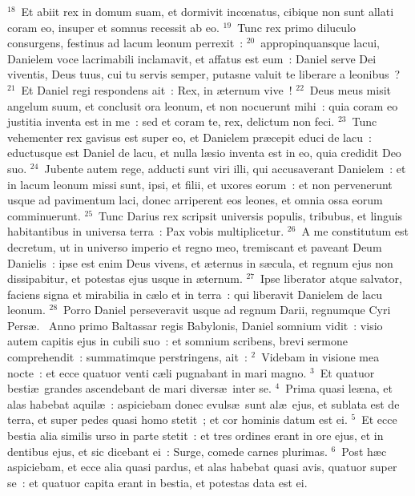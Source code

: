 ${}^{18}$~Et abiit rex in domum suam, et dormivit incœnatus, cibique non sunt allati coram eo, insuper et somnus recessit ab eo.
${}^{19}$~Tunc rex primo diluculo consurgens, festinus ad lacum leonum perrexit~:
${}^{20}$~appropinquansque lacui, Danielem voce lacrimabili inclamavit, et affatus est eum~: Daniel serve Dei viventis, Deus tuus, cui tu servis semper, putasne valuit te liberare a leonibus~?
${}^{21}$~Et Daniel regi respondens ait~: Rex, in \ae ternum vive~!
${}^{22}$~Deus meus misit angelum suum, et conclusit ora leonum, et non nocuerunt mihi~: quia coram eo justitia inventa est in me~: sed et coram te, rex, delictum non feci.
${}^{23}$~Tunc vehementer rex gavisus est super eo, et Danielem pr\ae cepit educi de lacu~: eductusque est Daniel de lacu, et nulla l\ae sio inventa est in eo, quia credidit Deo suo.
${}^{24}$~Jubente autem rege, adducti sunt viri illi, qui accusaverant Danielem~: et in lacum leonum missi sunt, ipsi, et filii, et uxores eorum~: et non pervenerunt usque ad pavimentum laci, donec arriperent eos leones, et omnia ossa eorum comminuerunt.
${}^{25}$~Tunc Darius rex scripsit universis populis, tribubus, et linguis habitantibus in universa terra~: Pax vobis multiplicetur.
${}^{26}$~A me constitutum est decretum, ut in universo imperio et regno meo, tremiscant et paveant Deum Danielis~: ipse est enim Deus vivens, et \ae ternus in s\ae cula, et regnum ejus non dissipabitur, et potestas ejus usque in \ae ternum.
${}^{27}$~Ipse liberator atque salvator, faciens signa et mirabilia in c\ae lo et in terra~: qui liberavit Danielem de lacu leonum.
${}^{28}$~Porro Daniel perseveravit usque ad regnum Darii, regnumque Cyri Pers\ae .
~\lettrine[lines=10,image=true,loversize=0.05,lraise=-0.03]{A}{}nno primo Baltassar regis Babylonis, Daniel somnium vidit~: visio autem capitis ejus in cubili suo~: et somnium scribens, brevi sermone comprehendit~: summatimque perstringens, ait~:
${}^{2}$~Videbam in visione mea nocte~: et ecce quatuor venti c\ae li pugnabant in mari magno.
${}^{3}$~Et quatuor besti\ae\ grandes ascendebant de mari divers\ae\ inter se.
${}^{4}$~Prima quasi le\ae na, et alas habebat aquil\ae~: aspiciebam donec evuls\ae\ sunt al\ae\ ejus, et sublata est de terra, et super pedes quasi homo stetit~; et cor hominis datum est ei.
${}^{5}$~Et ecce bestia alia similis urso in parte stetit~: et tres ordines erant in ore ejus, et in dentibus ejus, et sic dicebant ei~: Surge, comede carnes plurimas.
${}^{6}$~Post h\ae c aspiciebam, et ecce alia quasi pardus, et alas habebat quasi avis, quatuor super se~: et quatuor capita erant in bestia, et potestas data est ei.
